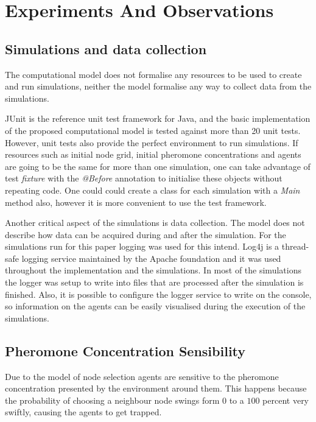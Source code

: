 \chapter{Experiments And Observations}
\label{ch:experiments-and-observations}

\section{Simulations and data collection}
\label{sec:running-sim}

The computational model does not formalise any resources to be used to create and run simulations, neither the model formalise any way to collect data from the simulations.

JUnit is the reference unit test framework for Java, and the basic implementation of the proposed computational model is tested against more than 20 unit tests. However, unit tests also provide the perfect environment to run simulations. If resources such as initial node grid, initial pheromone concentrations and agents are going to be the same for more than one simulation, one can take advantage of test \emph{fixture} with the \emph{@Before} annotation to initialise these objects without repeating code. One could could create a class for each simulation with a \emph{Main} method also, however it is more convenient to use the test framework.

Another critical aspect of the simulations is data collection. The model does not describe how data can be acquired during and after the simulation. For the simulations run for this paper logging was used for this intend. Log4j is a thread-safe logging service maintained by the Apache foundation and it was used throughout the implementation and the simulations. In most of the simulations the logger was setup to write into files that are processed after the simulation is finished. Also, it is possible to configure the logger service to write on the console, so information on the agents can be easily visualised during the execution of the simulations.

\section{Pheromone Concentration Sensibility}

Due to the model of node selection agents are sensitive to the pheromone concentration presented by the environment around them. This happens because the probability of choosing a neighbour node swings form $0$ to a $100$ percent very swiftly, causing the agents to get trapped.

